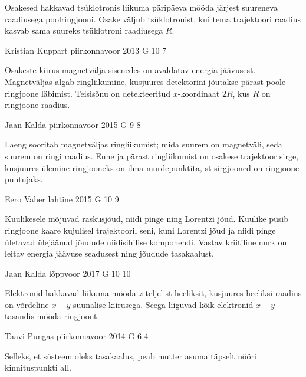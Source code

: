 \documentclass[11pt]{article}
\begin{document}
{{\ifHint
Osakesed hakkavad tsüklotronis liikuma päripäeva mööda järjest suureneva raadiusega poolringjooni. Osake väljub tsüklotronist, kui tema trajektoori raadius kasvab sama suureks tsüklotroni raadiusega $R$.
\fi
}

{Kristian Kuppart} %
{piirkonnavoor} %
{2013} %
{G 10} %
{7} %
{

\ifHint
Osakeste kiirus magnetvälja sisenedes on avaldatav energia jäävusest. Magnetväljas algab ringliikumine, kusjuures detektorini jõutakse pärast poole ringjoone läbimist. Teisisõnu on detekteeritud $x$-koordinaat $2R$, kus $R$ on ringjoone raadius.
\fi
}

{Jaan Kalda} %
{piirkonnavoor} %
{2015} %
{G 9} %
{8} %
{

\ifHint
Laeng sooritab magnetväljas ringliikumist; mida suurem on magnetväli, seda suurem on ringi raadius. Enne ja pärast ringliikumist on osakese trajektoor sirge, kusjuures ülemine ringjooneks on ilma murdepunktita, st sirgjooned on ringjoone puutujaks.
\fi
}

{Eero Vaher} %
{lahtine} %
{2015} %
{G 10} %
{9} %
{

\ifHint
Kuulikesele mõjuvad raskusjõud, niidi pinge ning Lorentzi jõud. Kuulike püsib ringjoone kaare kujulisel trajektooril seni, kuni Lorentzi jõud ja niidi pinge ületavad ülejäänud jõudude niidisihilise komponendi. Vastav kriitiline nurk on leitav energia jäävuse seadusest ning jõudude tasakaalust.
\fi
}

{Jaan Kalda} %
{lõppvoor} %
{2017} %
{G 10} %
{10} %
{

\ifHint
Elektronid hakkavad liikuma mööda $z$-teljelist heeliksit, kusjuures heeliksi raadius on võrdeline $x-y$ suunalise kiirusega. Seega liiguvad kõik elektronid $x-y$ tasandis mööda ringjoont.
\fi
}

{Taavi Pungas} %
{piirkonnavoor} %
{2014} %
{G 6} %
{4} %
{

\ifHint
Selleks, et süsteem oleks tasakaalus, peab mutter asuma täpselt nööri kinnituspunkti all.
\fi
}

}
\end{document}

